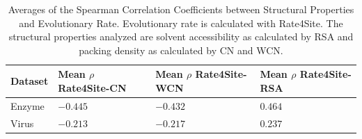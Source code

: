 \documentclass[12pt]{article}
\begin{document}
\begin{center}
	\begin{table}[H]
	\begin{tabular}{| p{1.5cm} | p{2.5cm} | p{2cm} | p{2cm} |  }
		\hline
		Dataset & Mean $\rho$ Rate4Site-CN  & Mean $\rho$ Rate4Site-WCN & Mean $\rho$ Rate4Site-RSA \\
		\hline	
		Enzyme &  $-0.445$  & $-0.432$ & $0.464$ \\[0.10cm]
	
		Virus & $-0.213$ & $-0.217$ & $0.237$ \\
		\hline	
	\end{tabular}
	\caption{Averages of the Spearman Correlation Coefficients between Structural Properties and Evolutionary Rate. Evolutionary rate is calculated with Rate4Site. The structural properties analyzed are solvent accessibility as calculated by RSA and packing density as calculated by CN and WCN.}
	\label{table:rate_stats}
	\end{table}
\end{center}
\end{document}

